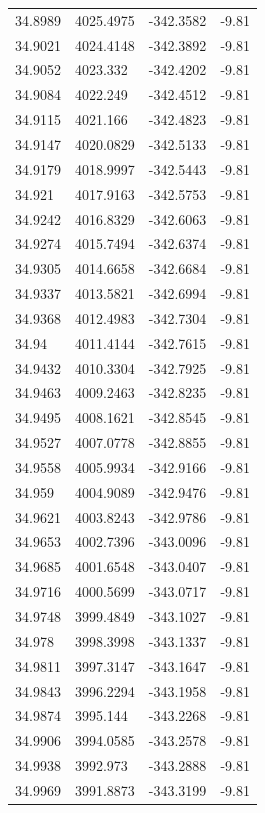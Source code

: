 \begin{table}[H]
\begin{tabular}{llll}
34.8989 & 4025.4975 & -342.3582 & -9.81 \\
34.9021 & 4024.4148 & -342.3892 & -9.81 \\
34.9052 & 4023.332 & -342.4202 & -9.81 \\
34.9084 & 4022.249 & -342.4512 & -9.81 \\
34.9115 & 4021.166 & -342.4823 & -9.81 \\
34.9147 & 4020.0829 & -342.5133 & -9.81 \\
34.9179 & 4018.9997 & -342.5443 & -9.81 \\
34.921 & 4017.9163 & -342.5753 & -9.81 \\
34.9242 & 4016.8329 & -342.6063 & -9.81 \\
34.9274 & 4015.7494 & -342.6374 & -9.81 \\
34.9305 & 4014.6658 & -342.6684 & -9.81 \\
34.9337 & 4013.5821 & -342.6994 & -9.81 \\
34.9368 & 4012.4983 & -342.7304 & -9.81 \\
34.94 & 4011.4144 & -342.7615 & -9.81 \\
34.9432 & 4010.3304 & -342.7925 & -9.81 \\
34.9463 & 4009.2463 & -342.8235 & -9.81 \\
34.9495 & 4008.1621 & -342.8545 & -9.81 \\
34.9527 & 4007.0778 & -342.8855 & -9.81 \\
34.9558 & 4005.9934 & -342.9166 & -9.81 \\
34.959 & 4004.9089 & -342.9476 & -9.81 \\
34.9621 & 4003.8243 & -342.9786 & -9.81 \\
34.9653 & 4002.7396 & -343.0096 & -9.81 \\
34.9685 & 4001.6548 & -343.0407 & -9.81 \\
34.9716 & 4000.5699 & -343.0717 & -9.81 \\
34.9748 & 3999.4849 & -343.1027 & -9.81 \\
34.978 & 3998.3998 & -343.1337 & -9.81 \\
34.9811 & 3997.3147 & -343.1647 & -9.81 \\
34.9843 & 3996.2294 & -343.1958 & -9.81 \\
34.9874 & 3995.144 & -343.2268 & -9.81 \\
34.9906 & 3994.0585 & -343.2578 & -9.81 \\
34.9938 & 3992.973 & -343.2888 & -9.81 \\
34.9969 & 3991.8873 & -343.3199 & -9.81 \\

\end{tabular}
\end{table}
